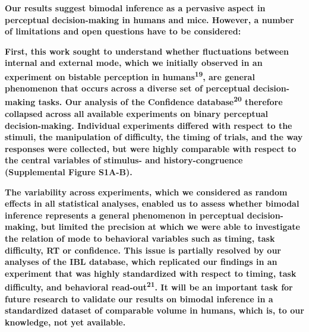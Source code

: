 \documentclass[
]{article}
\begin{document}
\textbf{Our results suggest bimodal inference as a pervasive aspect in
perceptual decision-making in humans and mice. However, a number of
limitations and open questions have to be considered:}

\textbf{First, this work sought to understand whether fluctuations
between internal and external mode, which we initially observed in an
experiment on bistable perception in humans\textsuperscript{19}, are
general phenomenon that occurs across a diverse set of perceptual
decision-making tasks. Our analysis of the Confidence
database\textsuperscript{20} therefore collapsed across all available
experiments on binary perceptual decision-making. Individual experiments
differed with respect to the stimuli, the manipulation of difficulty,
the timing of trials, and the way responses were collected, but were
highly comparable with respect to the central variables of stimulus- and
history-congruence (Supplemental Figure S1A-B).}

\textbf{The variability across experiments, which we considered as
random effects in all statistical analyses, enabled us to assess whether
bimodal inference represents a general phenomenon in perceptual
decision-making, but limited the precision at which we were able to
investigate the relation of mode to behavioral variables such as timing,
task difficulty, RT or confidence. This issue is partially resolved by
our analyses of the IBL database, which replicated our findings in an
experiment that was highly standardized with respect to timing, task
difficulty, and behavioral read-out\textsuperscript{21}. It will be an
important task for future research to validate our results on bimodal
inference in a standardized dataset of comparable volume in humans,
which is, to our knowledge, not yet available.}
\end{document}
